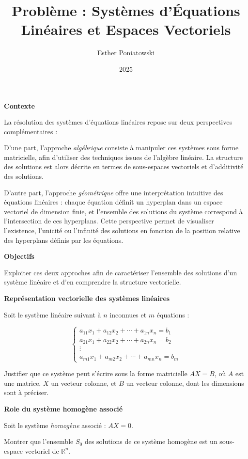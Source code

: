 \documentclass[10pt,a4paper]{article}
\title{Problème : Systèmes d'Équations Linéaires et Espaces Vectoriels}
\author{Esther Poniatowski}
\date{2025}
\begin{document}
\textbf{Contexte}

La résolution des systèmes d'équations linéaires repose sur deux perspectives complémentaires :

D'une part, l'approche \textit{algébrique} consiste à manipuler ces systèmes sous forme matricielle,
afin d'utiliser des techniques issues de l'algèbre linéaire. La structure des solutions est alors
décrite en termes de sous-espaces vectoriels et d'additivité des solutions.

D'autre part, l'approche \textit{géométrique} offre une interprétation intuitive des équations
linéaires : chaque équation définit un hyperplan dans un espace vectoriel de dimension finie, et
l'ensemble des solutions du système correspond à l'intersection de ces hyperplans. Cette perspective
permet de visualiser l'existence, l'unicité ou l'infinité des solutions en fonction de la position
relative des hyperplans définis par les équations.

\bigskip
\textbf{Objectifs}

Exploiter ces deux approches afin de caractériser l'ensemble des solutions d'un système linéaire et
d'en comprendre la structure vectorielle.

\bigskip
\textbf{Représentation vectorielle des systèmes linéaires}

Soit le système linéaire suivant à $n$ inconnues et $m$ équations :

$$
\begin{cases}
a_{11}x_1 + a_{12}x_2 + \cdots + a_{1n}x_n = b_1 \\
a_{21}x_1 + a_{22}x_2 + \cdots + a_{2n}x_n = b_2 \\
\vdots \\
a_{m1}x_1 + a_{m2}x_2 + \cdots + a_{mn}x_n = b_m
\end{cases}
$$

\q Justifier que ce système peut s'écrire sous la forme matricielle $AX = B$, où $A$ est une
matrice, $X$ un vecteur colonne, et $B$ un vecteur colonne, dont les dimensions sont à préciser.

\bigskip
\textbf{Role du système homogène associé}

\bigskip
Soit le système \textit{homogène} associé : $AX = 0$.

\q Montrer que l'ensemble $S_0$ des solutions de ce système homogène est un sous-espace vectoriel de
$\mathbb{R}^n$.
\end{document}
